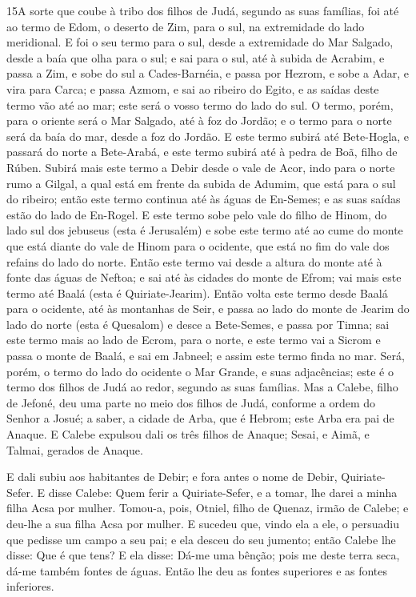 \lettrine{15} A sorte que coube à tribo dos filhos de Judá,
segundo as suas famílias, foi até ao termo de Edom, o deserto de
Zim, para o sul, na extremidade do lado meridional. E foi o seu
termo para o sul, desde a extremidade do Mar Salgado, desde a baía
que olha para o sul; e sai para o sul, até à subida de Acrabim,
e passa a Zim, e sobe do sul a Cades-Barnéia, e passa por Hezrom, e
sobe a Adar, e vira para Carca; e passa Azmom, e sai ao ribeiro
do Egito, e as saídas deste termo vão até ao mar; este será o vosso
termo do lado do sul. O termo, porém, para o oriente será o Mar
Salgado, até à foz do Jordão; e o termo para o norte será da baía do
mar, desde a foz do Jordão. E este termo subirá até Bete-Hogla,
e passará do norte a Bete-Arabá, e este termo subirá até à pedra de
Boã, filho de Rúben. Subirá mais este termo a Debir desde o vale
de Acor, indo para o norte rumo a Gilgal, a qual está em frente da
subida de Adumim, que está para o sul do ribeiro; então este termo
continua até às águas de En-Semes; e as suas saídas estão do lado de
En-Rogel. E este termo sobe pelo vale do filho de Hinom, do lado
sul dos jebuseus (esta é Jerusalém) e sobe este termo até ao cume do
monte que está diante do vale de Hinom para o ocidente, que está no
fim do vale dos refains do lado do norte. Então este termo vai
desde a altura do monte até à fonte das águas de Neftoa; e sai até
às cidades do monte de Efrom; vai mais este termo até Baalá (esta é
Quiriate-Jearim). Então volta este termo desde Baalá para o
ocidente, até às montanhas de Seir, e passa ao lado do monte de
Jearim do lado do norte (esta é Quesalom) e desce a Bete-Semes, e
passa por Timna; sai este termo mais ao lado de Ecrom, para o
norte, e este termo vai a Sicrom e passa o monte de Baalá, e sai em
Jabneel; e assim este termo finda no mar. Será, porém, o
termo do lado do ocidente o Mar Grande, e suas adjacências; este é o
termo dos filhos de Judá ao redor, segundo as suas famílias.
Mas a Calebe, filho de Jefoné, deu uma parte no meio dos
filhos de Judá, conforme a ordem do Senhor a Josué; a saber, a
cidade de Arba, que é Hebrom; este Arba era pai de Anaque. E
Calebe expulsou dali os três filhos de Anaque; Sesai, e Aimã, e
Talmai, gerados de Anaque.

E dali subiu aos habitantes de Debir; e fora antes o nome de
Debir, Quiriate-Sefer. E disse Calebe: Quem ferir a
Quiriate-Sefer, e a tomar, lhe darei a minha filha Acsa por mulher.
Tomou-a, pois, Otniel, filho de Quenaz, irmão de Calebe; e
deu-lhe a sua filha Acsa por mulher. E sucedeu que, vindo ela
a ele, o persuadiu que pedisse um campo a seu pai; e ela desceu do
seu jumento; então Calebe lhe disse: Que é que tens? E ela
disse: Dá-me uma bênção; pois me deste terra seca, dá-me também
fontes de águas. Então lhe deu as fontes superiores e as fontes
inferiores.

